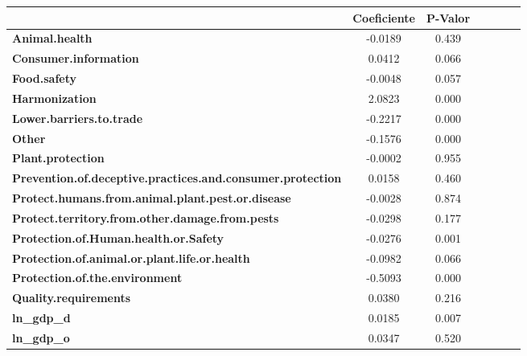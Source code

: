 \begin{table}[ht]
    \begin{center}
        \begin{tabular}{lcccccc}
            & \textbf{Coeficiente} & \textbf{P-Valor}\\
            \midrule
\textbf{Animal.health}                                             &      -0.0189  &         0.439   \\
\textbf{Consumer.information}                                      &       0.0412  &         0.066   \\
\textbf{Food.safety}                                               &      -0.0048  &         0.057   \\
\textbf{Harmonization}                                             &       2.0823  &         0.000   \\
\textbf{Lower.barriers.to.trade}                                   &      -0.2217  &         0.000   \\
\textbf{Other}                                                     &      -0.1576  &         0.000   \\
\textbf{Plant.protection}                                          &      -0.0002  &         0.955   \\
\textbf{Prevention.of.deceptive.practices.and.consumer.protection} &       0.0158  &         0.460   \\
\textbf{Protect.humans.from.animal.plant.pest.or.disease}          &      -0.0028  &         0.874   \\
\textbf{Protect.territory.from.other.damage.from.pests}            &      -0.0298  &         0.177   \\
\textbf{Protection.of.Human.health.or.Safety}                      &      -0.0276  &         0.001   \\
\textbf{Protection.of.animal.or.plant.life.or.health}              &      -0.0982  &         0.066   \\
\textbf{Protection.of.the.environment}                             &      -0.5093  &         0.000   \\
\textbf{Quality.requirements}                                      &       0.0380  &         0.216   \\
\textbf{ln\_gdp\_d}                                                &       0.0185  &         0.007   \\
\textbf{ln\_gdp\_o}                                                &       0.0347  &         0.520   \\

\end{tabular}
\end{center}
\end{table}
